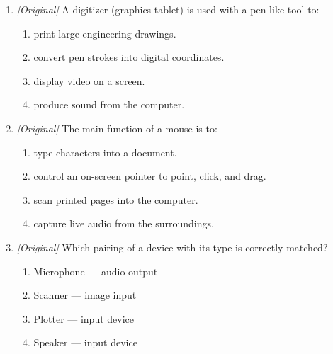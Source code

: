 \begin{enumerate}[label=\textbf{Q\arabic*.}, leftmargin=*]
\begin{enumerate}[label=\Alph*.]
    \item II and III only
    \item I and III only
    \item I, II and III
  \end{enumerate}
\item \textit{[Original]} A digitizer (graphics tablet) is used with a
  pen-like tool to:
  \begin{enumerate}[label=\Alph*.]
    \item print large engineering drawings.
    \item convert pen strokes into digital coordinates.
    \item display video on a screen.
    \item produce sound from the computer.
  \end{enumerate}
\item \textit{[Original]} The main function of a mouse is to:
  \begin{enumerate}[label=\Alph*.]
    \item type characters into a document.
    \item control an on-screen pointer to point, click, and drag.
    \item scan printed pages into the computer.
    \item capture live audio from the surroundings.
  \end{enumerate}
\item \textit{[Original]} Which pairing of a device with its type is correctly
  matched?
  \begin{enumerate}[label=\Alph*.]
    \item Microphone --- audio output
    \item Scanner --- image input
    \item Plotter --- input device
    \item Speaker --- input device
  \end{enumerate}


\end{enumerate}
